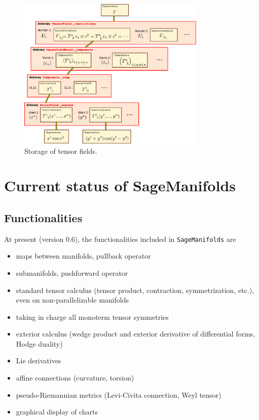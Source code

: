 \documentclass[a4paper]{jpconf}
\newcommand{\soft}[1]{\texttt{#1}}
\newcommand{\SM}{\soft{SageManifolds}}
\begin{document}
\begin{figure}
\begin{center}
\includegraphics[width=0.8\textwidth]{tensorfield_structure.pdf}
\end{center}
\caption{\label{f:tensorfield_structure} Storage of tensor fields.}
\end{figure}




\section{Current status of SageManifolds}

\subsection{Functionalities} \label{s:functionalities}
At present (version 0.6), the functionalities included in \SM{} are 
\begin{itemize}
\item maps between manifolds, pullback operator
\item submanifolds, pushforward operator
\item standard tensor calculus (tensor product, 
contraction, symmetrization, etc.), even on non-parallelizable manifolds
\item taking in charge all monoterm tensor symmetries 
\item exterior calculus (wedge product and exterior derivative of differential forms,
Hodge duality)
\item Lie derivatives
\item affine connections (curvature, torsion)
\item pseudo-Riemannian metrics (Levi-Civita connection, Weyl tensor)
\item graphical display of charts
\end{itemize}
\end{document}
